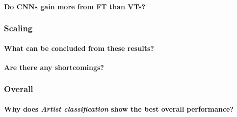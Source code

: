 

\paragraph{Do CNNs gain more from FT than VTs?}

\subsubsection{Scaling}

\paragraph{What can be concluded from these results?}

\paragraph{Are there any shortcomings?}

\subsubsection{Overall}

\paragraph{Why does \textit{Artist classification} show the best overall performance?}

